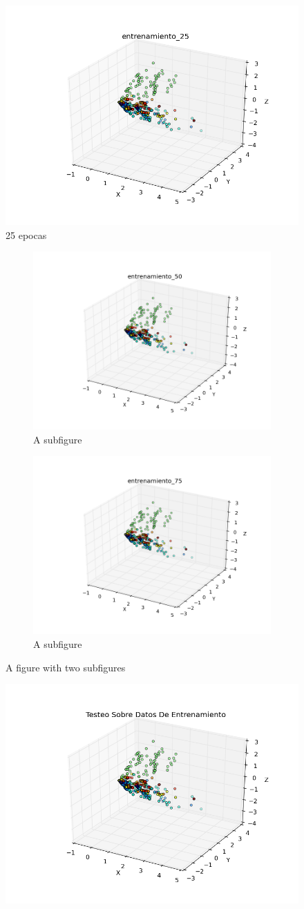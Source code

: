 \begin{figure}[h!]
  \centering
  \includegraphics[width=.6\linewidth]{img/convergencia_sanger/entrenamiento_25.png}
\caption{25 epocas}
\label{fig:test}
\end{figure}


\begin{figure}[h!]
\centering
\begin{subfigure}{.5\textwidth}
  \centering
  \includegraphics[width=.4\linewidth]{img/convergencia_sanger/entrenamiento_50.png}
  \caption{A subfigure}
  \label{fig:sub1}
\end{subfigure}%
\begin{subfigure}{.5\textwidth}
  \centering
  \includegraphics[width=.4\linewidth]{img/convergencia_sanger/entrenamiento_75.png}
  \caption{A subfigure}
  \label{fig:sub2}
\end{subfigure}
\caption{A figure with two subfigures}
\label{fig:test}
\end{figure}

\begin{figure}[h!]
	\centering
	\includegraphics[width=.6\linewidth]{img/convergencia_sanger/entrenamiento_100.png}
	\label{fig:test1}
	\centering
\end{figure}


